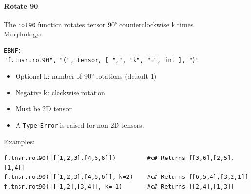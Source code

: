 \paragraph{Rotate 90}
The \texttt{rot90} function rotates tensor 90° counterclockwise k times.\\
Morphology:
\begin{verbatim}
EBNF:
"f.tnsr.rot90", "(", tensor, [ ",", "k", "=", int ], ")"
\end{verbatim}
\begin{itemize}
\item Optional k: number of 90° rotations (default 1)
\item Negative k: clockwise rotation
\item Must be 2D tensor
\item A \texttt{Type Error} is raised for non-2D tensors.
\end{itemize}
Examples:
\begin{verbatim}
f.tnsr.rot90(|[[1,2,3],[4,5,6]])         #c# Returns [[3,6],[2,5],[1,4]]
f.tnsr.rot90(|[[1,2,3],[4,5,6]], k=2)    #c# Returns [[6,5,4],[3,2,1]]
f.tnsr.rot90(|[[1,2],[3,4]], k=-1)       #c# Returns [[2,4],[1,3]]
\end{verbatim}

